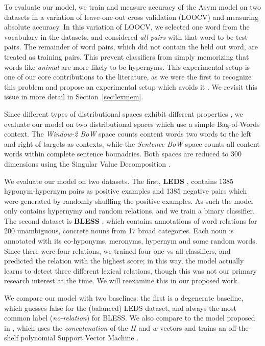 \documentclass[12pt]{article}
\begin{document}
To evaluate our model, we train and measure accuracy of the Asym model on
two datasets in a variation of leave-one-out cross validation (LOOCV) and
measuring absolute accuracy. In this variation of LOOCV, we selected one word
from the vocabulary in the datasets, and considered {\em all pairs} with that
word to be test pairs. The remainder of word pairs, which did not contain the
held out word, are treated as training pairs. This prevent classifiers from
simply memorizing that words like {\em animal} are more likely to be hypernyms.
This experimental setup is one of our core contributions to the literature, as
we were the first to recognize this problem and propose an experimental
setup which avoids it \cite{roller:2014:coling}. We revisit this issue in
more detail in Section~\ref{sec:lexmem}.

Since different types of distributional spaces exhibit different properties
\cite{pado:2007:cl}, we evaluate our model on two distributional
spaces which use a simple Bag-of-Words context.  The {\em Window-2 BoW} space
counts content words two words to the left and right of targets as contexts,
while the {\em Sentence BoW} space counts all content words within complete
sentence bounadries. Both spaces are reduced to 300 dimensions using the
Singular Value Decomposition \cite{landauer:1997:pr}.

We evaluate our model on two datasets. The first, {\bf LEDS}
\cite{baroni:2012:eacl}, contains 1385 hyponym-hypernym pairs as positive
examples and 1385 negative pairs which were generated by randomly shuffling the
positive examples. As such the model only contains hypernymy and random
relations, and we train a binary classifier. The second dataset is {\bf
BLESS} \cite{baroni:2011:gems}, which contains annotations of word relations
for 200 unambiguous, concrete nouns from 17 broad categories. Each noun is
annotated with its co-hyponyms, meronyms, hypernym and some random words.
Since there were four relations, we trained four one-vs-all classifiers, and
predicted the relation with the highest score; in this way, the model
actually learns to detect three different lexical relations, though this
was not our primary research interest at the time. We will reexamine this in
our proposed work.

We compare our model with two baselines: the first is a degenerate baseline,
which guesses false for the (balanced) LEDS dataset, and always
the most common label ({\em no-relation}) for BLESS. We also compare to the
model proposed in , which uses the {\em concatenation}
of the $H$ and $w$ vectors and trains an off-the-shelf polynomial Support
Vector Machine \cite{cortes:1995:ml}.
\end{document}
